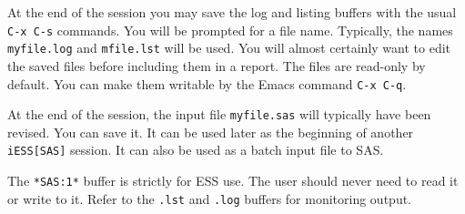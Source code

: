 \documentclass{article}
\begin{document}
At the end of the session you may save the log and listing buffers
with the usual \texttt{C-x C-s} commands.  You will be prompted for a
file name.  Typically, the names \texttt{myfile.log} and
\texttt{mfile.lst} will be used.  You will almost certainly want to
edit the saved files before including them in a report.  The files are
read-only by default.  You can make them writable by the Emacs command
\texttt{C-x C-q}.
 
At the end of the session, the input file \texttt{myfile.sas} will
typically have been revised.  You can save it.  It can be used later
as the beginning of another \texttt{iESS[SAS]} session.  It can also
be used as a batch input file to SAS.
 
The \texttt{*SAS:1*} buffer is strictly for ESS use.  The user should
never need to read it or write to it.  Refer to the \texttt{.lst} and
\texttt{.log} buffers for monitoring output.



\end{document}
